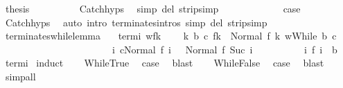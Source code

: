 \begin{isabellebody}
\ {\isacharquery}thesis\isanewline
\ \ \ \ \ \ \ \ \isamarkupfalse%
\ Catch{\isachardot}hyps\ \isamarkupfalse%
\ {\isacharparenleft}simp\ del{\isacharcolon}\ strip{\isacharunderscore}simp{\isacharparenright}\isanewline
\ \ \ \ \isamarkupfalse%
\isanewline
\ \ \isacommand{{\isacharbraceright}}\isamarkupfalse%
\isanewline
\ \ \isamarkupfalse%
\ \isamarkupfalse%
\ {\isacharquery}case\isanewline
\ \ \ \ \isamarkupfalse%
\ Catch{\isachardot}hyps\ \isamarkupfalse%
\ {\isacharparenleft}auto\ intro{\isacharcolon}\ terminates{\isachardot}intros\ simp\ del{\isacharcolon}\ strip{\isacharunderscore}simp{\isacharparenright}\isanewline
{}\isamarkupfalse%
%
\endisatagproof
{\isafoldproof}%
%
\isadelimproof
%
\endisadelimproof
%
\isamarkuptrue%
\isamarkupfalse%
\ terminates{\isacharunderscore}while{\isacharunderscore}lemma{\isacharcolon}\isanewline
\ \ \ termi{\isacharcolon}\ {\isachardoublequoteopen}{\isasymGamma}{\isasymturnstile}w{\isasymdown}fk{\isachardoublequoteclose}\ \isanewline
\ \ \ {\isachardoublequoteopen}{\isasymAnd}k\ b\ c{\isachardot}\ {\isasymlbrakk}fk\ {\isacharequal}\ Normal\ {\isacharparenleft}f\ k{\isacharparenright}{\isacharsemicolon}\ w{\isacharequal}While\ b\ c{\isacharsemicolon}\ \isanewline
\ \ \ \ \ \ \ \ \ \ \ \ \ \ \ \ \ \ \ \ \ \ \ {\isasymforall}i{\isachardot}\ {\isasymGamma}{\isasymturnstile}{\isasymlangle}c{\isacharcomma}Normal\ {\isacharparenleft}f\ i{\isacharparenright}\ {\isasymrangle}\ {\isasymRightarrow}\ Normal\ {\isacharparenleft}f\ {\isacharparenleft}Suc\ i{\isacharparenright}{\isacharparenright}{\isasymrbrakk}\isanewline
\ \ \ \ \ \ \ \ \ {\isasymLongrightarrow}\ {\isasymexists}i{\isachardot}\ f\ i\ {\isasymnotin}\ b{\isachardoublequoteclose}\isanewline
%
\isadelimproof
%
\endisadelimproof
%
\isatagproof
{}\isamarkupfalse%
\ termi\isanewline
{}\isamarkupfalse%
\ {\isacharparenleft}induct{\isacharparenright}\isanewline
\ \ \isamarkupfalse%
\ WhileTrue\ \isamarkupfalse%
\ {\isacharquery}case\ \isamarkupfalse%
\ blast\isanewline
{}\isamarkupfalse%
\isanewline
\ \ \isamarkupfalse%
\ WhileFalse\ \isamarkupfalse%
\ {\isacharquery}case\ \isamarkupfalse%
\ blast\isanewline
{}\isamarkupfalse%
\ simp{\isacharunderscore}all%
\endisatagproof
{\isafoldproof}%
%

\end{isabellebody}
